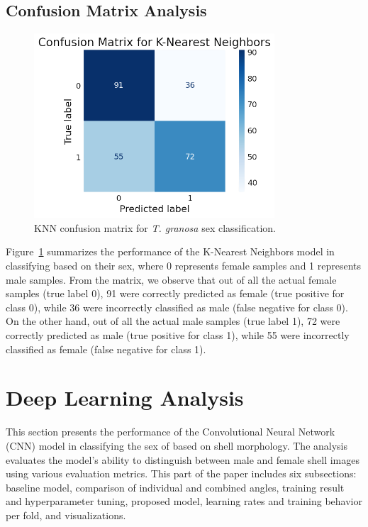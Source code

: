 \subsection{Confusion Matrix Analysis}

\begin{figure}[!htbp]
	\centering
	\includegraphics[width=0.8\textwidth]{figures/confusion_matrix_ml.png}
	\caption{KNN confusion matrix for \textit{T. granosa} sex classification.}
	\label{fig:cm_ml}
\end{figure}

Figure~\ref{fig:cm_ml} summarizes the performance of the K-Nearest Neighbors model in classifying \Tgranosa based on their sex, where 0 represents female samples and 1 represents male samples. From the matrix, we observe that out of all the actual female samples (true label 0), 91 were correctly predicted as female (true positive for class 0), while 36 were incorrectly classified as male (false negative for class 0). On the other hand, out of all the actual male samples (true label 1), 72 were correctly predicted as male (true positive for class 1), while 55 were incorrectly classified as female (false negative for class 1).

\section{Deep Learning Analysis}
This section presents the performance of the Convolutional Neural Network (CNN) model in classifying the sex of \Tgranosa based on shell morphology. The analysis evaluates the model's ability to distinguish between male and female shell images using various evaluation metrics. This part of the paper includes six subsections: baseline model, comparison of individual and combined angles, training result and hyperparameter tuning, proposed model, learning rates and training behavior per fold, and visualizations.

